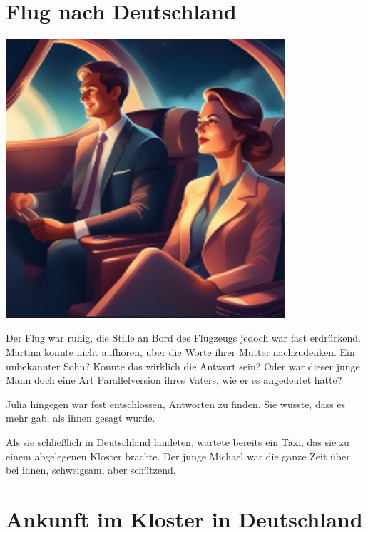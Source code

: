 \documentclass[
]{article}
\begin{document}
\section{Flug nach Deutschland}\label{flug-nach-deutschland}

\includegraphics[width=4.09531in,height=4.08008in]{media/image9.png}

Der Flug war ruhig, die Stille an Bord des Flugzeugs jedoch war fast
erdrückend. Martina konnte nicht aufhören, über die Worte ihrer Mutter
nachzudenken. Ein unbekannter Sohn? Konnte das wirklich die Antwort
sein? Oder war dieser junge Mann doch eine Art Parallelversion ihres
Vaters, wie er es angedeutet hatte?

Julia hingegen war fest entschlossen, Antworten zu finden. Sie wusste,
dass es mehr gab, als ihnen gesagt wurde.

Als sie schließlich in Deutschland landeten, wartete bereits ein Taxi,
das sie zu einem abgelegenen Kloster brachte. Der junge Michael war die
ganze Zeit über bei ihnen, schweigsam, aber schützend.

\section{Ankunft im Kloster in
Deutschland}\label{ankunft-im-kloster-in-deutschland}
\end{document}
